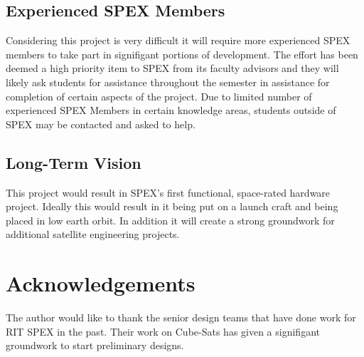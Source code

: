 \documentclass[conference]{IEEEtran} %
\begin{document}
\subsection{Experienced SPEX Members}
Considering this project is very difficult it will require more experienced SPEX members to take part in signifigant portions of development.  The effort has been deemed a high priority item to SPEX from its faculty advisors and they  will likely ask students for assistance throughout the semester in assistance for completion of certain aspects of the project.  Due to limited number of experienced SPEX Members in certain knowledge areas, students outside of SPEX may be contacted and asked to help.

\subsection{Long-Term Vision}
\label{sec:vision}
This project would result in SPEX's first functional, space-rated hardware project.  Ideally this would result in it being put on a launch craft and being placed in low earth orbit.  In addition it will create a strong groundwork for additional satellite engineering projects.

\section*{Acknowledgements}
The author would like to thank the senior design teams that have done work for RIT SPEX in the past.  Their work on Cube-Sats has given a signifigant groundwork to start preliminary designs.


\end{document}
